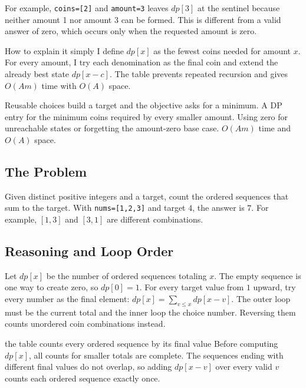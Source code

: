 For example, \texttt{coins=[2]} and \texttt{amount=3} leaves \(dp[3]\) at the
sentinel because neither amount 1 nor amount 3 can be formed. This is different
from a valid answer of zero, which occurs only when the requested amount is
zero.

\begin{revisionbox}{How to explain it simply}
I define \(dp[x]\) as the fewest coins needed for amount \(x\). For every
amount, I try each denomination as the final coin and extend the already
best state \(dp[x-c]\). The table prevents repeated recursion and gives
\(O(A m)\) time with \(O(A)\) space.
\end{revisionbox}
\chaptercheckpoint
  {Reusable choices build a target and the objective asks for a minimum.}
  {A DP entry for the minimum coins required by every smaller amount.}
  {Using zero for unreachable states or forgetting the amount-zero base case.}
  {$O(A m)$ time and $O(A)$ space.}
\judgeclassnote



\subsection{The Problem}
Given distinct positive integers and a target, count the ordered sequences that
sum to the target. With \texttt{nums=[1,2,3]} and target \(4\), the answer is
\(7\). For example, \([1,3]\) and \([3,1]\) are different combinations.

\subsection{Reasoning and Loop Order}
Let \(dp[x]\) be the number of ordered sequences totaling \(x\). The empty
sequence is one way to create zero, so \(dp[0]=1\). For every target value
from \(1\) upward, try every number as the final element: \(dp[x] = \sum_{v\le x} dp[x-v].\)
The outer loop must be the current total and the inner loop the choice
number. Reversing them counts unordered coin combinations instead.

\begin{invariantbox}{the table counts every ordered sequence by its final value}
Before computing \(dp[x]\), all counts for smaller totals are complete. The
sequences ending with different final values do not overlap, so adding
\(dp[x-v]\) over every valid \(v\) counts each ordered sequence exactly once.
\end{invariantbox}

